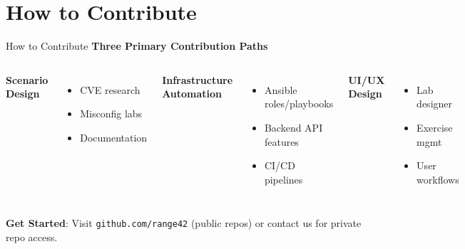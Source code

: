 \documentclass[aspectratio=169]{beamer}
\begin{document}
\section{How to Contribute}

\begin{frame}{How to Contribute \; \faUsers}
  \textbf{Three Primary Contribution Paths}\\[3mm]
  
  \begin{columns}[T]
    \textbf{Scenario Design}
    \begin{itemize}
      \item CVE research
      \item Misconfig labs
      \item Documentation
    \end{itemize}
    
    \textbf{Infrastructure Automation}
    \begin{itemize}
      \item Ansible roles/playbooks
      \item Backend API features
      \item CI/CD pipelines
    \end{itemize}
    
    \textbf{UI/UX Design}
    \begin{itemize}
      \item Lab designer
      \item Exercise mgmt
      \item User workflows
    \end{itemize}
  \end{columns}
  \vspace{5mm}
  \begin{tcolorbox}
    \faGithub\; \textbf{Get Started}: Visit \texttt{github.com/range42} (public repos) or contact us for private repo access.
  \end{tcolorbox}
\end{frame}
\end{document}
